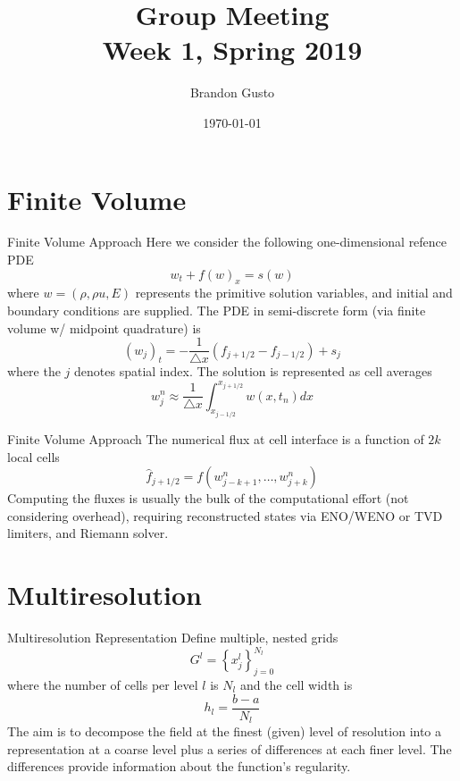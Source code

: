 \documentclass{beamer}
\begin{document}
\title{Group Meeting \\ Week 1, Spring 2019}
\author{Brandon Gusto} %
\date{\today}
\frame{\titlepage}

\section{Finite Volume}

\begin{frame}[shrink=15]{Finite Volume Approach}
	Here we consider the following one-dimensional refence PDE
	\begin{equation*}
		w_{t} + f(w)_{x} = s(w)
	\end{equation*}
	where $w = (\rho,\rho u,E)$ represents the primitive solution variables, and initial and boundary
	conditions are supplied. The PDE in semi-discrete form (via finite volume w/ midpoint quadrature) is
	\begin{equation*}
		(w_{j})_{t} = -\frac{1}{\triangle x} \left( f_{j+1/2} - f_{j-1/2} \right) + s_{j}
	\end{equation*}
	where the $j$ denotes spatial index. The solution is represented as cell averages
	\begin{equation*}
		w^{n}_{j} \approx \frac{1}{\triangle x} \int_{x_{j-1/2}}^{x_{j+1/2}} w(x,t_{n}) dx
	\end{equation*}
\end{frame}


\begin{frame}[shrink=15]{Finite Volume Approach}
	 The numerical flux at cell interface is a function of $2k$ local cells
	\begin{equation*}
		\hat{f}_{j+1/2} = f(w^{n}_{j-k+1},\dots,w^{n}_{j+k})
	\end{equation*}
	Computing the fluxes is usually the bulk of the computational effort (not considering overhead), requiring
	reconstructed states via ENO/WENO or TVD limiters, and Riemann solver.

\end{frame}


\section{Multiresolution}

\begin{frame}[shrink=15]{Multiresolution Representation}
	Define multiple, nested grids
	\begin{equation*}
		G^{l} = \left\{ x^{l}_{j} \right\}_{j=0}^{N_{l}}
	\end{equation*}
	where the number of cells per level $l$ is $N_{l}$ and the cell width is
	\begin{equation*}
		h_{l} = \frac{b-a}{N_{l}}
	\end{equation*}
	The aim is to decompose the field at the finest (given) level of resolution into a representation at a
	coarse level plus a series of differences at each finer level. The differences provide information about the
	function's regularity.
\end{frame}
\end{document}
